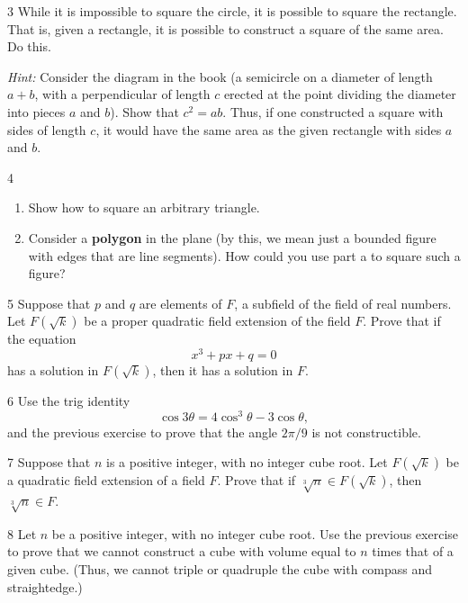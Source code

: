 \begin{problem}{3}
    While it is impossible to square the circle, it is possible to square the rectangle.
    That is, given a rectangle, it is possible to construct a square of the same area. Do
    this.

    \emph{Hint:} Consider the diagram in the book (a semicircle on a diameter of length
    $a + b$, with a perpendicular of length $c$ erected at the point dividing the diameter
    into pieces $a$ and $b$). Show that $c^2 = ab$. Thus, if one constructed a square with
    sides of length $c$, it would have the same area as the given rectangle with sides $a$
    and $b$.
\end{problem}
\unsolved

\begin{problem}{4}
    \begin{enumerate}
        \item[(a)] Show how to square an arbitrary triangle.
        \item[(b)] Consider a \textbf{polygon} in the plane (by this, we mean just a
        bounded figure with edges that are line segments). How could you use part a to
        square such a figure?
    \end{enumerate}
\end{problem}
\unsolved

\begin{problem}{5}
    Suppose that $p$ and $q$ are elements of $F$, a subfield of the field of real numbers.
    Let $F(\sqrt{k})$ be a proper quadratic field extension of the field $F$. Prove that if
    the equation
    \[x^3 + px + q = 0\]
    has a solution in $F(\sqrt{k})$, then it has a solution in $F$.
\end{problem}
\unsolved

\begin{problem}{6}
    Use the trig identity
    \[\cos 3\theta = 4\cos^3\theta - 3\cos\theta,\]
    and the previous exercise to prove that the angle $2\pi/9$ is not constructible.
\end{problem}
\unsolved

\begin{problem}{7}
    Suppose that $n$ is a positive integer, with no integer cube root. Let $F(\sqrt{k})$ be
    a quadratic field extension of a field $F$. Prove that if
    $\sqrt[3]{n} \in F(\sqrt{k})$, then $\sqrt[3]{n} \in F$.
\end{problem}
\unsolved

\begin{problem}{8}
    Let $n$ be a positive integer, with no integer cube root. Use the previous exercise to
    prove that we cannot construct a cube with volume equal to $n$ times that of a given
    cube. (Thus, we cannot triple or quadruple the cube with compass and straightedge.)
\end{problem}
\unsolved

